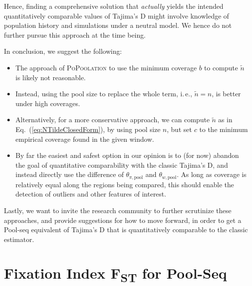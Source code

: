 \documentclass[a4paper,fontsize=9pt,DIV=14]{scrartcl}
\newcommand\toolname{\textsc}
\newcommand\eqnref[1]{Eq.~(\ref{#1})}
\newcommand{\fst}{F\textsubscript{ST}}
\begin{document}
Hence, finding a comprehensive solution that \emph{actually} yields the intended quantitatively comparable values of Tajima's D might involve knowledge of population history and simulations under a neutral model. We hence do not further pursue this approach at the time being.

In conclusion, we suggest the following: 

\begin{itemize}
    \item The approach of \toolname{PoPoolation} to use the minimum coverage $b$ to compute $\tilde{n}$ is likely not reasonable.
    \item Instead, using the pool size to replace the whole term, i.\,e., $\tilde{n} = n$, is better under high coverages.
    \item Alternatively, for a more conservative approach, we can compute $\tilde{n}$ as in \eqnref{eq:NTildeClosedForm}, by using pool size $n$, but set $c$ to the minimum empirical coverage found in the given window.
    \item By far the easiest and safest option in our opinion is to (for now) abandon the goal of quantitative comparability with the classic Tajima's D, and instead directly use the difference of $\theta_{\pi,\text{pool}}$ and $\theta_{w, \text{pool}}$.  As long as coverage is relatively equal along the regions being compared, this should enable the detection of outliers and other features of interest.
\end{itemize}

Lastly, we want to invite the research community to further scrutinize these approaches, and provide suggestions for how to move forward, in order to get a Pool-seq equivalent of Tajima's D that is quantitatively comparable to the classic estimator.


\section{Fixation Index \texorpdfstring{\fst}{FST} for Pool-Seq}
\label{supp:sec:FST}
\end{document}
